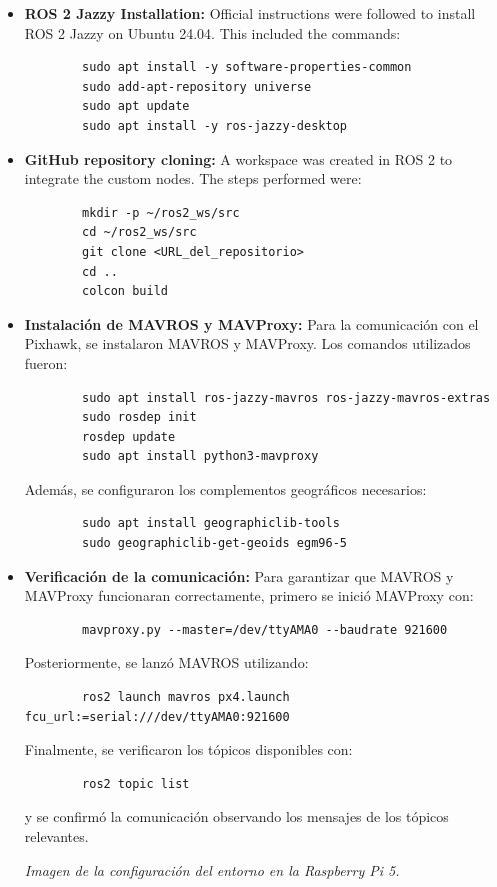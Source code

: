 \begin{itemize}
        \item \textbf{ROS 2 Jazzy Installation:} 
        Official instructions were followed to install ROS 2 Jazzy on Ubuntu 24.04. This included the commands:
                \begin{verbatim}
        sudo apt install -y software-properties-common
        sudo add-apt-repository universe
        sudo apt update
        sudo apt install -y ros-jazzy-desktop
        \end{verbatim}
    
        \item \textbf{GitHub repository cloning:} 
        A workspace was created in ROS 2 to integrate the custom nodes. The steps performed were:       
         \begin{verbatim}
        mkdir -p ~/ros2_ws/src
        cd ~/ros2_ws/src
        git clone <URL_del_repositorio>
        cd ..
        colcon build
        \end{verbatim}
        \item \textbf{Instalación de MAVROS y MAVProxy:} 
        Para la comunicación con el Pixhawk, se instalaron MAVROS y MAVProxy. Los comandos utilizados fueron:
        \begin{verbatim}
        sudo apt install ros-jazzy-mavros ros-jazzy-mavros-extras
        sudo rosdep init
        rosdep update
        sudo apt install python3-mavproxy
        \end{verbatim}
        Además, se configuraron los complementos geográficos necesarios:
        \begin{verbatim}
        sudo apt install geographiclib-tools
        sudo geographiclib-get-geoids egm96-5
        \end{verbatim}
    
        \item \textbf{Verificación de la comunicación:} 
        Para garantizar que MAVROS y MAVProxy funcionaran correctamente, primero se inició MAVProxy con:
        \begin{verbatim}
        mavproxy.py --master=/dev/ttyAMA0 --baudrate 921600
        \end{verbatim}
        Posteriormente, se lanzó MAVROS utilizando:
        \begin{verbatim}
        ros2 launch mavros px4.launch fcu_url:=serial:///dev/ttyAMA0:921600
        \end{verbatim}
        Finalmente, se verificaron los tópicos disponibles con:
        \begin{verbatim}
        ros2 topic list
        \end{verbatim}
        y se confirmó la comunicación observando los mensajes de los tópicos relevantes.
        
        \begin{center} 
            \textit{Imagen de la configuración del entorno en la Raspberry Pi 5.} 
        \end{center}
    \end{itemize}
    
